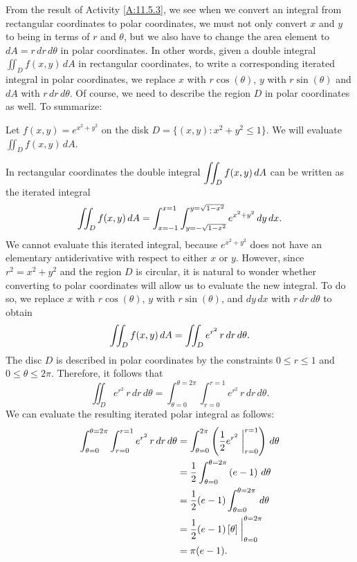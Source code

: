 


From the result of Activity \ref{A:11.5.3}, we see when we convert an integral from rectangular coordinates to polar coordinates, we must not only convert $x$ and $y$ to being in terms of $r$ and $\theta$, but we also have to change the area element to $dA = r \, dr \, d\theta$ in polar coordinates. In other words, given a double integral $\iint_D f(x,y) \, dA$ in rectangular coordinates, to write a corresponding iterated integral in polar coordinates, we replace $x$ with $r \cos(\theta)$, $y$ with $r \sin(\theta)$ and $dA$ with $r \, dr \, d\theta$. Of course, we need to describe the region $D$ in polar coordinates as well. To summarize:

 \vspace*{5pt}
\nin {}
\vspace*{5pt}


\begin{example} Let $f(x,y) = e^{x^2+y^2}$ on the disk $D = \{(x,y) : x^2 + y^2 \leq 1\}$.  We will evaluate $\iint_D f(x,y) \, dA$.

In rectangular coordinates the double integral $\displaystyle \iint_D f(x,y) \, dA$ can be written as the iterated integral
\[\displaystyle \iint_D f(x,y) \, dA = \int_{x=-1}^{x=1} \int_{y=-\sqrt{1-x^2}}^{y=\sqrt{1-x^2}} e^{x^2+y^2} \, dy \, dx.\]
We cannot evaluate this iterated integral, because $e^{x^2 + y^2}$ does not have an elementary antiderivative with respect to either $x$ or $y$.  However, since $r^2=x^2+y^2$ and the region $D$ is circular, it is natural to wonder whether converting to polar coordinates will allow us to evaluate the new integral. To do so, we replace $x$ with $r \cos(\theta)$, $y$ with $r \sin(\theta)$, and $dy \, dx$ with $r \, dr \, d\theta$ to obtain
\[\displaystyle \iint_D f(x,y) \, dA = \iint_D e^{r^2} \, r \, dr \, d\theta.\]
The disc $D$ is described in polar coordinates by the constraints $0 \leq r \leq 1$ and $0 \leq \theta \leq 2\pi$.  Therefore, it follows that
\[\iint_D e^{r^2} \, r \, dr \, d\theta = \int_{\theta=0}^{\theta = 2\pi} \int_{r=0}^{r=1} e^{r^2} \, r \, dr \, d\theta.\]
We can evaluate the resulting iterated polar integral as follows:
\begin{align*}
\int_{\theta=0}^{\theta = 2\pi} \int_{r=0}^{r=1} e^{r^2} \, r \, dr \, d\theta &= \int_{\theta=0}^{2\pi}  \left( \frac{1}{2}e^{r^2}\biggm|_{r=0}^{r=1} \right) \, d\theta \\
	&= \frac{1}{2} \int_{\theta=0}^{\theta = 2\pi} \left( e-1 \right) \, d\theta \\
	&= \frac{1}{2}(e-1) \int_{\theta=0}^{\theta = 2\pi} \, d\theta \\
	&= \frac{1}{2}(e-1)\left[\theta\right]\biggm|_{\theta=0}^{\theta = 2\pi} \\
	&= \pi(e-1).
\end{align*}
\end{example}

